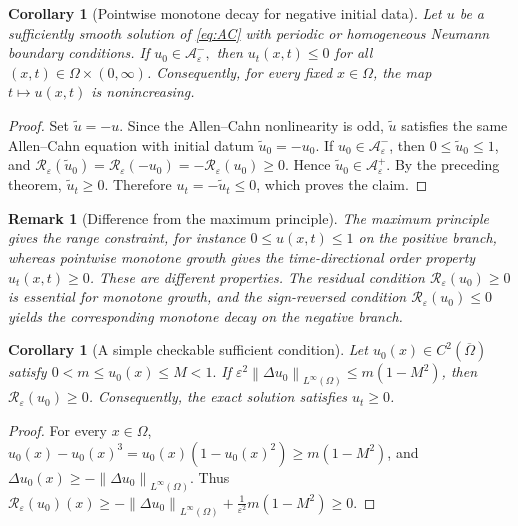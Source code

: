 \documentclass[final, 3p, times]{elsarticle}%
\newcommand{\eps}{\varepsilon}
\newcommand{\Reps}{\mathcal R_\varepsilon}
\newcommand{\Aepsp}{\mathcal A_\varepsilon^+}
\newcommand{\Aeps}{\Aepsp}
\newcommand{\Aepsm}{\mathcal A_\varepsilon^-}
\newcommand{\norm}[1]{\left\lVert #1\right\rVert}
\newtheorem{corollary}[theorem]{Corollary}
\newtheorem{remark}[theorem]{Remark}
\begin{document}
\begin{corollary}[Pointwise monotone decay for negative initial data]
Let \(u\) be a sufficiently smooth solution of \eqref{eq:AC} with periodic or homogeneous Neumann boundary conditions. If
$u_0\in\Aepsm,$
then $u_t(x,t)\le0$ for all $(x,t)\in\Omega\times(0,\infty)$.
Consequently, for every fixed \(x\in\Omega\), the map \(t\mapsto u(x,t)\) is nonincreasing.
\end{corollary}

\begin{proof}
Set \(\widetilde u=-u\). Since the Allen--Cahn nonlinearity is odd, \(\widetilde u\) satisfies the same Allen--Cahn equation with initial datum \(\widetilde u_0=-u_0\). If \(u_0\in\Aepsm\), then
$0\le \widetilde u_0\le1$,
and
$
\Reps(\widetilde u_0)=\Reps(-u_0)=-\Reps(u_0)\ge0.
$
Hence \(\widetilde u_0\in\Aeps\). By the preceding theorem, \(\widetilde u_t\ge0\). Therefore \(u_t=-\widetilde u_t\le0\), which proves the claim.
\end{proof}

\begin{remark}[Difference from the maximum principle]
The maximum principle gives the range constraint, for instance \(0\le u(x,t)\le1\) on the positive branch, whereas pointwise monotone growth gives the time-directional order property \(u_t(x,t)\ge0\). These are different properties. The residual condition \(\Reps(u_0)\ge0\) is essential for monotone growth, and the sign-reversed condition \(\Reps(u_0)\le0\) yields the corresponding monotone decay on the negative branch.
\end{remark}

\begin{corollary}[A simple checkable sufficient condition]\label{cor:checkable-condition}
Let \(u_0(x)\in C^2(\overline\Omega)\) satisfy
\(
    0<m\le u_0(x)\le M<1.
\)
If $\eps^2\norm{\Delta u_0}_{L^\infty(\Omega)}\le m(1-M^2)$,
then \(\Reps(u_0)\ge0\). Consequently, the exact solution satisfies \(u_t\ge0\).
\end{corollary}

\begin{proof}
For every \(x\in\Omega\),
$u_0(x)-u_0(x)^3=u_0(x)(1-u_0(x)^2)\ge m(1-M^2)$,
and
$\Delta u_0(x)\ge-\norm{\Delta u_0}_{L^\infty(\Omega)}.$
Thus
$
\Reps(u_0)(x)\ge -\norm{\Delta u_0}_{L^\infty(\Omega)}+\frac{1}{\eps^2}m(1-M^2)\ge0.
$
\end{proof}
\end{document}
